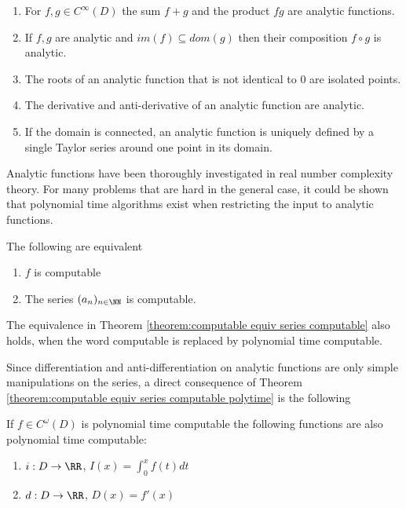 		\begin{enumerate}
			\item For $f,g \in C^\infty(D)$ the sum  $f+g$ and the product $fg$ are analytic functions.
			\item If $f, g$ are analytic and $im(f) \subseteq dom(g)$ then their composition $f \circ g$ is analytic.
			\item The roots of an analytic function that is not identical to $0$ are isolated points.
			\item The derivative and anti-derivative of an analytic function are analytic.
			\item If the domain is connected, an analytic function is uniquely defined by a single Taylor series around one point in its domain.
		\end{enumerate}

		Analytic functions have been thoroughly investigated in real number complexity theory.
		For many problems that are hard in the general case, it could be shown that polynomial time algorithms exist when restricting the input to
		analytic functions.

		\begin{theorem}\label{theorem:computable equiv series computable} 
			The following are equivalent
			\begin{enumerate}
				\item $f$ is computable 
				\item The series $(a_n)_{n \in \NN}$ is computable. 
 			\end{enumerate}
		\end{theorem}
		\begin{theorem}[M\"uller]\label{theorem:computable equiv series computable polytime}
			The equivalence in Theorem \ref{theorem:computable equiv series computable} also holds, when the word computable is replaced by polynomial time computable.
		\end{theorem}
		
		Since differentiation and anti-differentiation on analytic functions are only simple manipulations on the series, 
		a direct consequence of Theorem \ref{theorem:computable equiv series computable polytime} is the following
		\begin{corollary}
			If $f \in C^\omega(D)$ is polynomial time computable the following functions are also polynomial time computable:
			\begin{enumerate}
				\item $i: D \to \RR$, $I(x) = \int_0^x f(t) dt$
				\item $d: D \to \RR$, $D(x) = f'(x)$ 
			\end{enumerate}
		\end{corollary}
		
